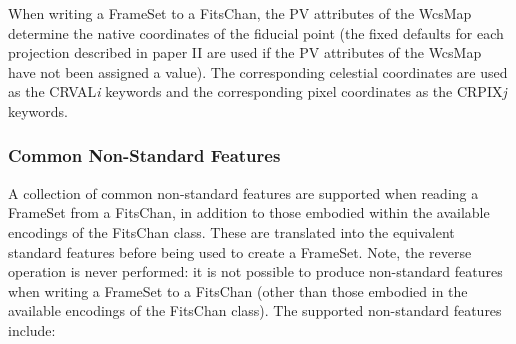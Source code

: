 \documentclass[twoside,11pt]{article}
\begin{document}
When writing a FrameSet to a FitsChan, the PV attributes of the WcsMap
determine the native coordinates of the fiducial point (the fixed
defaults for each projection described in paper II are used if the PV
attributes of the WcsMap have not been assigned a value). The
corresponding celestial coordinates are used as the CRVAL\emph{i}
keywords and the corresponding pixel coordinates as the CRPIX\emph{j}
keywords.

\subsubsection{Common Non-Standard Features}
A collection of common non-standard features are supported when reading a
FrameSet from a FitsChan, in addition
to those embodied within the
available encodings of the FitsChan class. These are translated into the
equivalent standard features before being used to create a FrameSet.
Note, the reverse operation is never performed: it is not possible to
produce non-standard features when writing a FrameSet to a FitsChan
(other than those embodied in the available encodings of the FitsChan
class). The supported non-standard features include:
\end{document}
